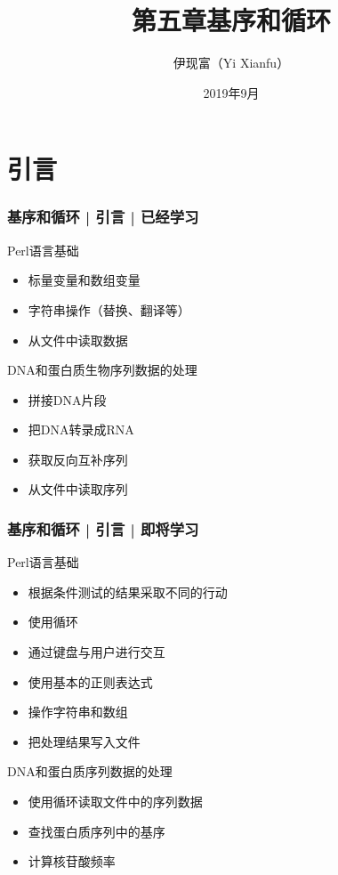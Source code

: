 


\title[基序和循环]{第五章\quad 基序和循环}
\author[Yixf]{伊现富（Yi Xianfu）}
\date{2019年9月}




\section{引言}
\begin{frame}
  \frametitle{基序和循环 | 引言 | 已经学习}
  \begin{block}{Perl语言基础}
    \begin{itemize}
      \item 标量变量和数组变量
      \item 字符串操作（替换、翻译等）
      \item 从文件中读取数据
    \end{itemize}
  \end{block}
  \pause
  \begin{block}{DNA和蛋白质生物序列数据的处理}
    \begin{itemize}
      \item 拼接DNA片段
      \item 把DNA转录成RNA
      \item 获取反向互补序列
      \item 从文件中读取序列
    \end{itemize}
  \end{block}
\end{frame}
\begin{frame}
  \frametitle{基序和循环 | 引言 | 即将学习}
  \begin{block}{Perl语言基础}
    \begin{itemize}
      \item 根据条件测试的结果采取不同的行动
      \item 使用循环
      \item 通过键盘与用户进行交互
      \item 使用基本的正则表达式
      \item 操作字符串和数组
      \item 把处理结果写入文件
    \end{itemize}
  \end{block}
  \pause
  \begin{block}{DNA和蛋白质序列数据的处理}
    \begin{itemize}
      \item 使用循环读取文件中的序列数据
      \item 查找蛋白质序列中的基序
      \item 计算核苷酸频率
    \end{itemize}
  \end{block}
\end{frame}


